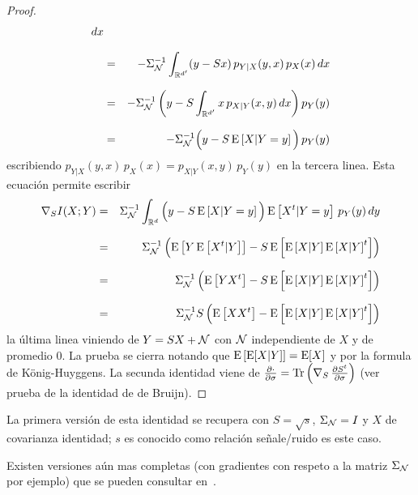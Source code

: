 \begin{proof}
\begin{eqnarray*}
  dx\\[2.5mm]
  & = & - \Sigma_{\mathcal{N}}^{-1} \int_{\mathbb{R}^{d'}} (y - S x) \, p_{Y|X}(y,x) \, p_X(x) \,
  dx\\[2.5mm]
  & = & - \Sigma_{\mathcal{N}}^{-1} \left( y - S \int_{\mathbb{R}^{d'}} x \, p_{X|Y}(x,y) \,dx
  \right) p_Y(y)\\[2.5mm]
  & = & - \Sigma_{\mathcal{N}}^{-1} \Big( y - S \operatorname{E}\left[X | Y=y \right] \Big) \, p_Y(y)
  \end{eqnarray*}
  escribiendo $p_{Y|X}(y,x)  \, p_X(x) =  p_{X|Y}(x,y) \, p_Y(y)$ en  la tercera
  linea. Esta ecuaci\'on permite escribir
  \begin{eqnarray*}
  \nabla_S I(X;Y) & = & \Sigma_{\mathcal{N}}^{-1} \int_{\mathbb{R}^d} \Big( y - S \operatorname{E}\left[X |
  Y=y \right] \Big) \operatorname{E}\left[X^t | Y=y \right] \, p_Y(y) \, dy\\[2.5mm]
  & = & \Sigma_{\mathcal{N}}^{-1} \left( \operatorname{E}\left[ Y \operatorname{E}\left[ X^t|Y \right] \right] - S
  \operatorname{E}\left[ \operatorname{E}\left[X | Y \right] \operatorname{E}\left[X | Y \right]^t \right]
  \right)\\[2.5mm]
  & = & \Sigma_{\mathcal{N}}^{-1} \left( \operatorname{E}\left[ Y X^t \right] - S \operatorname{E}\left[ \operatorname{E}\left[X
  | Y \right] \operatorname{E}\left[X | Y \right]^t \right] \right)\\[2.5mm]
  & = & \Sigma_{\mathcal{N}}^{-1} S \left( \operatorname{E}\left[ X X^t \right] - \operatorname{E}\left[
  \operatorname{E}\left[X | Y \right] \operatorname{E}\left[X | Y \right]^t \right] \right)
  \end{eqnarray*}
  la \'ultima linea viniendo de $Y = S X + \mathcal{N}$ con $\mathcal{N}$ independiente de
  $X$ y  de promedio 0.  La  prueba se cierra notando  que $\operatorname{E}\left[ \operatorname{E}[X|Y]
  \right] = \operatorname{E}[X]$ y por  la formula de K\"onig-Huyggens. La secunda identidad
  viene  de  $\frac{\partial \cdot}{\partial  \sigma}  =  \operatorname{Tr}\left( \nabla_S  \,
    \frac{\partial S^t}{\partial \sigma} \right)$ (ver prueba de la identidad de
  de Bruijn).
\end{proof}
%
\noindent La primera versi\'on de esta identidad se recupera con $S = \sqrt{s}$,
$\Sigma_{\mathcal{N}}  =  I$  y $X$  de  covarianza  identidad;  $s$ es  conocido  como
relaci\'on se\~nale/ruido es este caso.

Existen versiones  a\'un mas completas (con  gradientes con respeto  a la matriz
$\Sigma_{\mathcal{N}}$ por  ejemplo) que se pueden  consultar en~\cite{Joh04, PalVer06,
  PayPal09}.

\begin{figure}[h!]
  \begin{center}   \end{center}  
\label{fig:SZ:deBruijnVerdu}
\end{figure}
\

